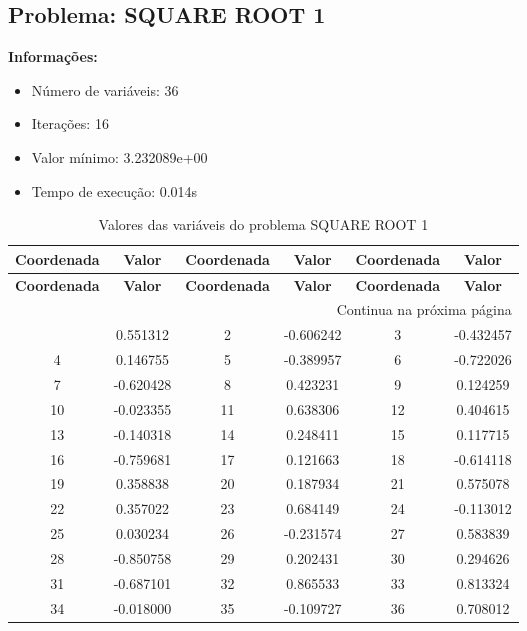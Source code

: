 \documentclass[12pt]{article}
\begin{document}
\newpage            
\subsection{Problema: SQUARE ROOT 1}

\textbf{Informações:}
\begin{itemize}
\item Número de variáveis: 36
\item Iterações: 16
\item Valor mínimo: 3.232089e+00
\item Tempo de execução: 0.014s
\end{itemize}

\small
\begin{longtable}{@{}cc|cc|cc@{}}
\caption{Valores das variáveis do problema SQUARE ROOT 1} \\
\toprule
\textbf{Coordenada} & \textbf{Valor} & \textbf{Coordenada} & \textbf{Valor} & \textbf{Coordenada} & \textbf{Valor} \\
\midrule
\endfirsthead

\toprule
\textbf{Coordenada} & \textbf{Valor} & \textbf{Coordenada} & \textbf{Valor} & \textbf{Coordenada} & \textbf{Valor} \\
\midrule
\endhead

\midrule \multicolumn{6}{r}{{Continua na próxima página}} \\ \midrule
\endfoot

\bottomrule
\endlastfoot
1 & 0.551312 & 2 & -0.606242 & 3 & -0.432457 \\
4 & 0.146755 & 5 & -0.389957 & 6 & -0.722026 \\
7 & -0.620428 & 8 & 0.423231 & 9 & 0.124259 \\
10 & -0.023355 & 11 & 0.638306 & 12 & 0.404615 \\
13 & -0.140318 & 14 & 0.248411 & 15 & 0.117715 \\
16 & -0.759681 & 17 & 0.121663 & 18 & -0.614118 \\
19 & 0.358838 & 20 & 0.187934 & 21 & 0.575078 \\
22 & 0.357022 & 23 & 0.684149 & 24 & -0.113012 \\
25 & 0.030234 & 26 & -0.231574 & 27 & 0.583839 \\
28 & -0.850758 & 29 & 0.202431 & 30 & 0.294626 \\
31 & -0.687101 & 32 & 0.865533 & 33 & 0.813324 \\
34 & -0.018000 & 35 & -0.109727 & 36 & 0.708012 \\

\end{longtable}
\end{document}
